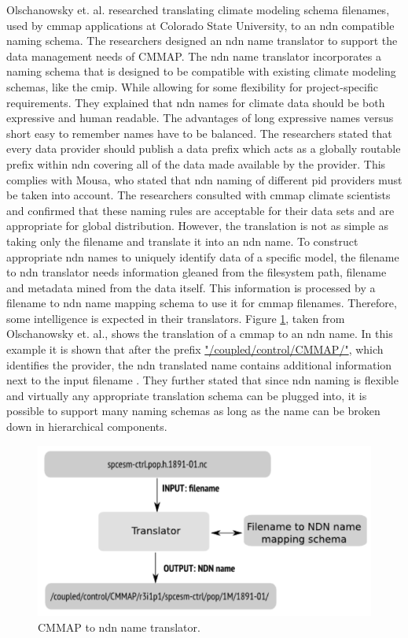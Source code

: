 Olschanowsky et. al. researched translating climate modeling schema filenames, used by \gls{cmmap} applications at Colorado State University, to an \gls{ndn} compatible 
naming schema. The researchers designed an \gls{ndn} name translator to support the data management needs of CMMAP. The \gls{ndn} name translator incorporates a naming schema that is designed to be compatible with existing climate modeling schemas, like the \gls{cmip}. While allowing for some flexibility for project-specific requirements. They explained that \gls{ndn} names for climate data should be both expressive and human readable. The advantages of long expressive names versus short easy to remember names have to be balanced.
The researchers stated that every data provider should publish a data prefix which acts as a globally
routable prefix within \gls{ndn} covering all of the data made available by the provider. This complies with Mousa, who stated that \gls{ndn} naming of different \gls{pid} providers must be taken into account. The researchers consulted with \gls{cmmap} climate scientists and confirmed that these naming rules are acceptable for their data sets and are appropriate for global distribution. 
However, the translation is not as simple as taking only the filename and translate it into an \gls{ndn} name. To construct appropriate \gls{ndn} names to uniquely identify data of a specific model, the filename to \gls{ndn} translator needs information gleaned from the filesystem path, filename and metadata mined from the data itself. This information is processed by a filename to \gls{ndn} name mapping schema to use it for \gls{cmmap} filenames. Therefore, some intelligence is expected in their translators.
Figure \ref{fig:cmmap_ndnn}, taken from Olschanowsky et. al., shows the translation of a \gls{cmmap} to an \gls{ndn} name. In this example it is shown that after the prefix \url{"/coupled/control/CMMAP/"}, which identifies the provider, the \gls{ndn} translated name contains additional information next to the input filename \cite{ndn-clim}.
They further stated that since \gls{ndn} naming is flexible and virtually any appropriate translation schema can be plugged into, it is possible to support many naming schemas as long as the name can be broken down in hierarchical components.

\begin{figure}[H]
\centering
\includegraphics[scale=0.4]{Images/cmip2ndn.png}
\caption{CMMAP to \gls{ndn} name translator.}
\label{fig:cmmap_ndnn}
\end{figure}

